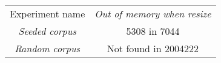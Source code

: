\begin{tabular}{c|c}
	Experiment name&\textit{Out of memory when resize}\\
\textit{Seeded corpus}&5308 in 7044\\
\textit{Random corpus}&Not found in 2004222
\end{tabular}
